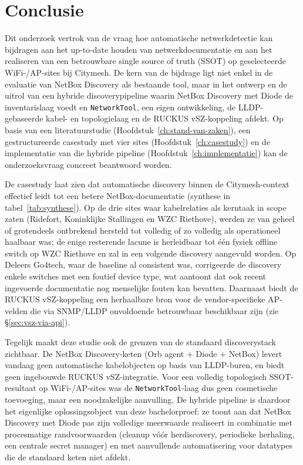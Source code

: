 
\chapter{Conclusie}%
\label{ch:conclusie}

Dit onderzoek vertrok van de vraag hoe automatische netwerkdetectie kan bijdragen aan het up-to-date houden van netwerkdocumentatie en aan het realiseren van een betrouwbare single source of truth (SSOT) op geselecteerde WiFi-/AP-sites bij Citymesh. De kern van de bijdrage ligt niet enkel in de evaluatie van NetBox Discovery als bestaande tool, maar in het ontwerp en de uitrol van een hybride discoverypipeline waarin NetBox Discovery met Diode de inventarislaag voedt en \texttt{NetworkTool}, een eigen ontwikkeling, de LLDP-gebaseerde kabel- en topologielaag en de RUCKUS vSZ-koppeling afdekt. Op basis van een literatuurstudie (Hoofdstuk~\ref{ch:stand-van-zaken}), een gestructureerde casestudy met vier sites (Hoofdstuk~\ref{ch:casestudy}) en de implementatie van die hybride pipeline (Hoofdstuk~\ref{ch:implementatie}) kan de onderzoeksvraag concreet beantwoord worden.

De casestudy laat zien dat automatische discovery binnen de Citymesh-context effectief leidt tot een betere NetBox-documentatie (synthese in tabel~\ref{tab:synthese}). Op de drie sites waar kabelrelaties als kerntaak in scope zaten (Ridefort, Koninklijke Stallingen en WZC Riethove), werden ze van geheel of grotendeels ontbrekend hersteld tot volledig of zo volledig als operationeel haalbaar was; de enige resterende lacune is herleidbaar tot \'e\'en fysiek offline switch op WZC Riethove en zal in een volgende discovery aangevuld worden. Op Deleers Go4tech, waar de baseline al consistent was, corrigeerde de discovery enkele switches met een foutief device type, wat aantoont dat ook recent ingevoerde documentatie nog menselijke fouten kan bevatten. Daarnaast biedt de RUCKUS vSZ-koppeling een herhaalbare bron voor de vendor-specifieke AP-velden die via SNMP/LLDP onvoldoende betrouwbaar beschikbaar zijn (zie \S\ref{sec:vsz-via-api}).

Tegelijk maakt deze studie ook de grenzen van de standaard discoverystack zichtbaar. De NetBox Discovery-keten (Orb agent + Diode + NetBox) levert vandaag geen automatische kabelobjecten op basis van LLDP-buren, en biedt geen ingebouwde RUCKUS vSZ-integratie. Voor een volledig topologisch SSOT-resultaat op WiFi-/AP-sites was de \texttt{NetworkTool}-laag dus geen cosmetische toevoeging, maar een noodzakelijke aanvulling. De hybride pipeline is daardoor het eigenlijke oplossingsobject van deze bachelorproef: ze toont aan dat NetBox Discovery met Diode pas zijn volledige meerwaarde realiseert in combinatie met procesmatige randvoorwaarden (cleanup vóór herdiscovery, periodieke herhaling, een centrale secret manager) en met aanvullende automatisering voor datatypes die de standaard keten niet afdekt.

